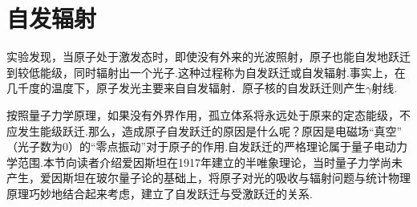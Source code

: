 \section[自发辐射]{自发辐射} \label{sec:09.04} %

实验发现，当原子处于激发态时，即使没有外来的光波照射，原子也能自发地跃迁到较低能级，同时辐射出一个光子.这种过程称为自发跃迁或自发辐射.事实上，在几千度的温度下，原子发光主要来自自发辐射．原子核的自发跃迁则产生$\gamma$射线.

按照量子力学原理，如果没有外界作用，孤立体系将永远处于原来的定态能级，不应发生能级跃迁.那么，造成原子自发跃迁的原因是什么呢？原因是电磁场“真空” （光子数为0）的“零点振动”对于原子的作用.自发跃迁的严格理论属于量子电动力学范围.本节向读者介绍爱因斯坦在1917年建立的半唯象理论，当时量子力学尚未产生，爱因斯坦在玻尔量子论的基础上，将原子对光的吸收与辐射问题与统计物理原理巧妙地结合起来考虑，建立了自发跃迁与受激跃迁的关系.

